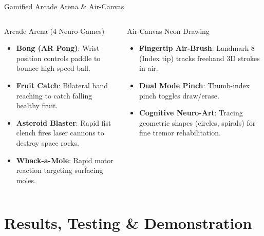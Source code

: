 \documentclass{beamer}
\begin{document}
\begin{frame}{Gamified Arcade Arena \& Air-Canvas}
\begin{columns}
\begin{block}{Arcade Arena (4 Neuro-Games)}
\begin{itemize}
    \item \textbf{Bong (AR Pong)}: Wrist position controls paddle to bounce high-speed ball.
    \item \textbf{Fruit Catch}: Bilateral hand reaching to catch falling healthy fruit.
    \item \textbf{Asteroid Blaster}: Rapid fist clench fires laser cannons to destroy space rocks.
    \item \textbf{Whack-a-Mole}: Rapid motor reaction targeting surfacing moles.
\end{itemize}
\end{block}

\begin{block}{Air-Canvas Neon Drawing}
\begin{itemize}
    \item \textbf{Fingertip Air-Brush}: Landmark 8 (Index tip) tracks freehand 3D strokes in air.
    \item \textbf{Dual Mode Pinch}: Thumb-index pinch toggles draw/erase.
    \item \textbf{Cognitive Neuro-Art}: Tracing geometric shapes (circles, spirals) for fine tremor rehabilitation.
\end{itemize}
\end{block}
\end{columns}
\end{frame}

\section{Results, Testing \& Demonstration}
\end{document}
